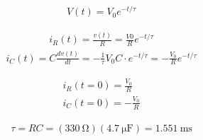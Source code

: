 \documentclass[
10pt, %
a4paper, %
oneside, %
headinclude,footinclude, %
BCOR5mm, %
]{scrartcl}
\begin{document}
\begin{align}
	V(t) = V_0 e^{-t/\tau} \nonumber
\end{align}

\begin{align}
	i_R(t) = \frac{v(t)}{R} = \frac{V0}{R} e^{-t/\tau} \nonumber
\end{align}
\begin{align}
	i_C(t) = C\frac{dv(t)}{dt} = -\frac{1}{\tau}V_0 C \cdot e^{-t/\tau} = -\frac{V_0}{R} e^{-t/\tau} \nonumber
\end{align}

\begin{align}
	i_R(t=0) = \frac{V_0}{R} \nonumber \\
	i_C(t=0) = -\frac{V_0}{R} \nonumber
\end{align}

\begin{align}
	\tau = RC = (\qty{330}{\ohm})(\qty{4.7}{\micro \farad}) = \qty{1.551}{\milli\second}
\end{align}


%


\end{document}
